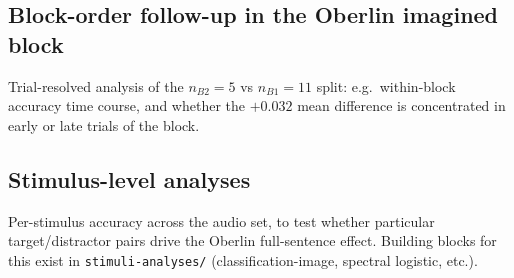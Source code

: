 \documentclass[11pt]{article}
\begin{document}
\begin{center}
\end{center}

\subsection{Block-order follow-up in the Oberlin imagined block}

Trial-resolved analysis of the $n_{B2}=5$ vs $n_{B1}=11$ split: e.g.\
within-block accuracy time course, and whether the $+0.032$ mean
difference is concentrated in early or late trials of the block.

\subsection{Stimulus-level analyses}

Per-stimulus accuracy across the audio set, to test whether particular
target/distractor pairs drive the Oberlin full-sentence effect.
Building blocks for this exist in \texttt{stimuli-analyses/}
(classification-image, spectral logistic, etc.).
\end{document}
